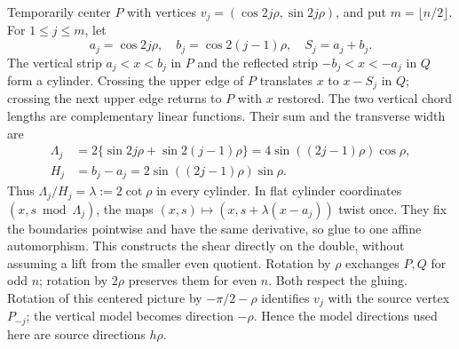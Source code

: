 \documentclass[11pt]{article}
\begin{document}
Temporarily center $P$ with vertices
$v_j=(\cos 2j\rho,\sin 2j\rho)$, and put $m=\lfloor n/2\rfloor$.
For $1\le j\le m$, let
\[
a_j=\cos 2j\rho,\quad b_j=\cos 2(j-1)\rho,\quad S_j=a_j+b_j.
\]
The vertical strip $a_j<x<b_j$ in $P$ and the reflected strip
$-b_j<x<-a_j$ in $Q$ form a cylinder. Crossing the upper edge of
$P$ translates $x$ to $x-S_j$ in $Q$; crossing the next upper edge
returns to $P$ with $x$ restored. The two vertical chord lengths
are complementary linear functions. Their sum and the transverse width are
\[
\begin{split}
\Lambda_j&=2\{\sin 2j\rho+\sin 2(j-1)\rho\}
          =4\sin((2j-1)\rho)\cos\rho,\\
H_j&=b_j-a_j=2\sin((2j-1)\rho)\sin\rho .
\end{split}
\]
Thus $\Lambda_j/H_j=\lambda:=2\cot\rho$ in every cylinder.
In flat cylinder coordinates $(x,s\bmod\Lambda_j)$, the maps
$(x,s)\mapsto(x,s+\lambda(x-a_j))$ twist once.
They fix the boundaries pointwise and have the same derivative, so glue
to one affine automorphism. This constructs the shear directly on
the double, without assuming a lift from the smaller even quotient.
Rotation by $\rho$ exchanges $P,Q$ for odd $n$; rotation by $2\rho$
preserves them for even $n$. Both respect the gluing.
Rotation of this centered picture by $-\pi/2-\rho$ identifies $v_j$
with the source vertex $P_{-j}$; the vertical model becomes direction
$-\rho$. Hence the model directions used here are source directions
$h\rho$.
\end{document}
